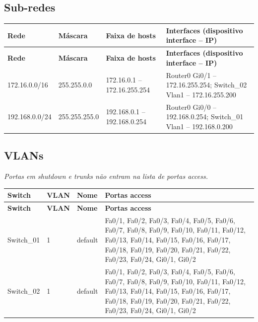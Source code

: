 \subsection{Sub-redes}
\begingroup\scriptsize\setlength{\tabcolsep}{3pt}
\begin{longtable}{@{}p{}p{}p{}p{}@{}}
\toprule \textbf{Rede} & \textbf{Máscara} & \textbf{Faixa de hosts} & \textbf{Interfaces (dispositivo interface – IP)} \\\midrule\endfirsthead
\toprule \textbf{Rede} & \textbf{Máscara} & \textbf{Faixa de hosts} & \textbf{Interfaces (dispositivo interface – IP)} \\\midrule\endhead
172.16.0.0/16 & 255.255.0.0 & 172.16.0.1 – 172.16.255.254 & Router0 Gi0/1 – 172.16.255.254; Switch\_02 Vlan1 – 172.16.255.200 \\
192.168.0.0/24 & 255.255.255.0 & 192.168.0.1 – 192.168.0.254 & Router0 Gi0/0 – 192.168.0.254; Switch\_01 Vlan1 – 192.168.0.200 \\
\bottomrule
\end{longtable}\endgroup

\subsection{VLANs}
\noindent\textit{Portas em shutdown e trunks não entram na lista de portas access.}\par\smallskip
\begingroup\scriptsize\setlength{\tabcolsep}{3pt}
\begin{longtable}{@{}p{}p{}p{}p{}@{}}
\toprule \textbf{Switch} & \textbf{VLAN} & \textbf{Nome} & \textbf{Portas access} \\\midrule\endfirsthead
\toprule \textbf{Switch} & \textbf{VLAN} & \textbf{Nome} & \textbf{Portas access} \\\midrule\endhead
Switch\_01 & 1 & default & Fa0/1, Fa0/2, Fa0/3, Fa0/4, Fa0/5, Fa0/6, Fa0/7, Fa0/8, Fa0/9, Fa0/10, Fa0/11, Fa0/12, Fa0/13, Fa0/14, Fa0/15, Fa0/16, Fa0/17, Fa0/18, Fa0/19, Fa0/20, Fa0/21, Fa0/22, Fa0/23, Fa0/24, Gi0/1, Gi0/2 \\
Switch\_02 & 1 & default & Fa0/1, Fa0/2, Fa0/3, Fa0/4, Fa0/5, Fa0/6, Fa0/7, Fa0/8, Fa0/9, Fa0/10, Fa0/11, Fa0/12, Fa0/13, Fa0/14, Fa0/15, Fa0/16, Fa0/17, Fa0/18, Fa0/19, Fa0/20, Fa0/21, Fa0/22, Fa0/23, Fa0/24, Gi0/1, Gi0/2 \\
\bottomrule
\end{longtable}\endgroup

